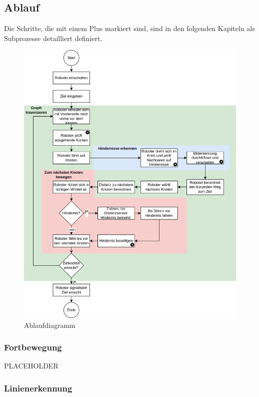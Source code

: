 \subsection{Ablauf}

Die Schritte, die mit einem Plus markiert sind, sind in den folgenden Kapiteln als Subprozesse detailliert definiert.

\begin{figure}[H]
\centering
\includegraphics[width=\textwidth]{assets/gesamtkonzept/ablaufdiagramm.png}
\caption{Ablaufdiagramm}
\label{fig:ablaufdiagramm}
\end{figure}

\subsubsection{Fortbewegung}

PLACEHOLDER

\subsubsection{Linienerkennung}

